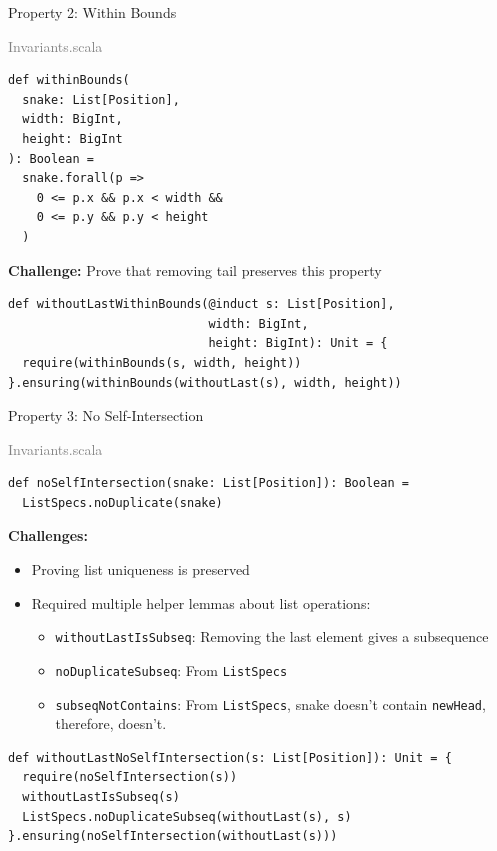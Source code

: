 \documentclass{beamer}
\begin{document}
\begin{frame}[fragile]{Property 2: Within Bounds}
\begin{flushright}
\tiny\textcolor{gray}{Invariants.scala}
\end{flushright}
\vspace{-0.5cm}
\begin{lstlisting}[style=scala]
def withinBounds(
  snake: List[Position],
  width: BigInt,
  height: BigInt
): Boolean =
  snake.forall(p => 
    0 <= p.x && p.x < width && 
    0 <= p.y && p.y < height
  )
\end{lstlisting}

\vspace{0.3cm}
\textbf{Challenge:} Prove that removing tail preserves this property

\begin{lstlisting}[style=scala]
def withoutLastWithinBounds(@induct s: List[Position], 
                            width: BigInt,
                            height: BigInt): Unit = {
  require(withinBounds(s, width, height))
}.ensuring(withinBounds(withoutLast(s), width, height))
\end{lstlisting}
\end{frame}

\begin{frame}[fragile]{Property 3: No Self-Intersection}
\begin{flushright}
\tiny\textcolor{gray}{Invariants.scala}
\end{flushright}
\vspace{-0.5cm}
\begin{lstlisting}[style=scala]
def noSelfIntersection(snake: List[Position]): Boolean =
  ListSpecs.noDuplicate(snake)
\end{lstlisting}

\vspace{0.3cm}
\textbf{Challenges:}
\begin{itemize}
  \item Proving list uniqueness is preserved
  \item Required multiple helper lemmas about list operations:
  \begin{itemize}
    \item \texttt{withoutLastIsSubseq}: Removing the last element gives a subsequence
    \item \texttt{noDuplicateSubseq}: From \texttt{ListSpecs}
    \item \texttt{subseqNotContains}: From \texttt{ListSpecs}, snake doesn't contain \texttt{newHead}, therefore,  doesn't.
  \end{itemize}
\end{itemize}

\vspace{0.3cm}
\begin{lstlisting}[style=scala]
def withoutLastNoSelfIntersection(s: List[Position]): Unit = {
  require(noSelfIntersection(s))
  withoutLastIsSubseq(s)
  ListSpecs.noDuplicateSubseq(withoutLast(s), s)
}.ensuring(noSelfIntersection(withoutLast(s)))
\end{lstlisting}
\end{frame}
\end{document}
